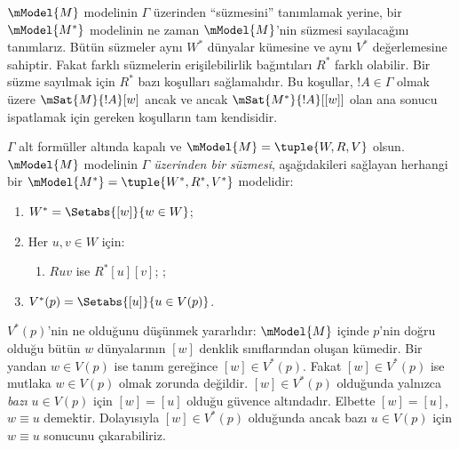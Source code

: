 \documentclass[../../../include/open-logic-section]{subfiles}
\begin{document}


$\mModel{M}$ modelinin $\Gamma$ üzerinden ``süzmesini'' tanımlamak yerine,
bir $\mModel{M^*}$ modelinin ne zaman $\mModel{M}$'nin süzmesi sayılacağını
tanımlarız. Bütün süzmeler aynı $W^*$ dünyalar kümesine ve aynı $V^*$
değerlemesine sahiptir. Fakat farklı süzmelerin erişilebilirlik bağıntıları
$R^*$ farklı olabilir. Bir süzme sayılmak için $R^*$ bazı koşulları
sağlamalıdır. Bu koşullar, $!A\in\Gamma$ olmak üzere
$\mSat{M}{!A}[w]$ ancak ve ancak $\mSat{M^*}{!A}[{[w]}]$ olan ana sonucu
ispatlamak için gereken koşulların tam kendisidir.

\begin{defn}
  $\Gamma$ alt formüller altında kapalı ve
  $\mModel{M}=\tuple{W,R,V}$ olsun. $\mModel{M}$ modelinin
  \emph{$\Gamma$ üzerinden bir süzmesi}, aşağıdakileri sağlayan herhangi bir
  $\mModel{M^*}=\tuple{W^*,R^*,V^*}$ modelidir:
  \begin{enumerate}
  \item $W^*=\Setabs{[w]}{w\in W}$;
  \item {}%
    Her $u,v\in W$ için:
    \begin{enumerate}
    \item {}%
      $Ruv$ ise $R^*[u][v]$;
    ;
    \end{enumerate}
  \item $V^*(p)=\Setabs{[u]}{u\in V(p)}$.
  \end{enumerate}
\end{defn}

$V^*(p)$'nin ne olduğunu düşünmek yararlıdır: $\mModel{M}$ içinde $p$'nin
doğru olduğu bütün $w$ dünyalarının $[w]$ denklik sınıflarından oluşan
kümedir. Bir yandan $w\in V(p)$ ise tanım gereğince $[w]\in V^*(p)$.
Fakat $[w]\in V^*(p)$ ise mutlaka $w\in V(p)$ olmak zorunda değildir.
$[w]\in V^*(p)$ olduğunda yalnızca \emph{bazı} $u\in V(p)$ için
$[w]=[u]$ olduğu güvence altındadır. Elbette $[w]=[u]$, $w\equiv u$
demektir. Dolayısıyla $[w]\in V^*(p)$ olduğunda ancak bazı $u\in V(p)$
için $w\equiv u$ sonucunu çıkarabiliriz.
\end{document}
